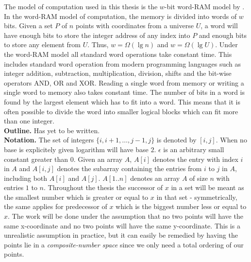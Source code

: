 The model of computation used in this thesis is the $w$-bit word-RAM model by \citet{fredman}. In the word-RAM model of computation, the memory is divided into words of $w$ bits. Given a set $P$ of $n$ points with coordinates from a universe $U$, a word will have enough bits to store the integer address of any index into $P$ and enough bits to store any element from $U$. Thus, $w = \Omega(\lg n)$ and $w = \Omega(\lg U)$. Under the word-RAM model all standard word operations take constant time. This includes standard word operation from modern programming languages such as integer addition, subtraction, multiplication, division, shifts and the bit-wise operators AND, OR and XOR. Reading a single word from memory or writing a single word to memory also takes constant time. The number of bits in a word is found by the largest element which has to fit into a word. This means that it is often possible to divide the word into smaller logical blocks which can fit more than one integer. \\ 


\noindent \textbf{Outline.} Has yet to be written. \\

\noindent \textbf{Notation.} The set of integers $\{i, i+1, \dots, j-1, j\}$ is denoted by $[i,j]$. When no base is explicitely given logarithm will have base $2$. $\epsilon$ is an arbitrary small constant greater than $0$. Given an array $A$, $A[i]$ denotes the entry with index $i$ in $A$ and $A[i,j]$ denotes the subarray containing the entries from $i$ to $j$ in $A$, including both $A[i]$ and $A[j]$. $A[1..n]$ denotes an array $A$ of size $n$ with entries $1$ to $n$. Throughout the thesis the successor of $x$ in a set will be meant as the smallest number which is greater or equal to $x$ in that set - symmetrically, the same applies for predecessor of $x$ which is the biggest number less or equal to $x$. The work will be done under the assumption that no two points will  have the same x-coordinate and no two points will have the same y-coordinate. This is a unrealistic assumption in practice, but it can easily be remedied by having the points lie in a \emph{composite-number space} since we only need a total ordering of our points.



